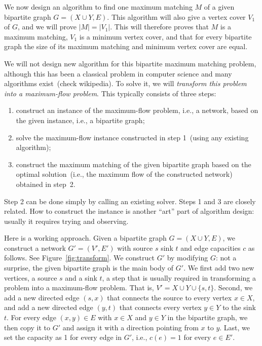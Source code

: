 We now design an algorithm to find one maximum matching $M$ of a given bipartite graph $G = (X\cup Y, E)$.
This algorithm will also give a vertex cover $V_1$ of $G$, and we will prove $|M| = |V_1|$.
This will therefore proves that $M$ is a maximum matching, $V_1$ is a minimum vertex cover, and that
for every bipartite graph the size of its maximum matching and minimum vertex cover are equal.

We will not design new algorithm for this bipartite maximum matching problem, although this has
been a classical problem in computer science and many algorithms exist~(check wikipedia).
To solve it, we will \emph{transform this problem into a maximum-flow problem}.
This typically consists of three steps:
\vspace*{-\topsep}
\begin{enumerate}
\item construct an instance of the maximum-flow problem, i.e., a network, based on the given instance, i.e., a bipartite graph;
\item solve the maximum-flow instance constructed in step 1~(using any existing algorithm);
\item construct the maximum matching of the given bipartite graph based on the optimal solution~(i.e., the maximum flow
of the constructed network) obtained in step~2.
\end{enumerate}

Step 2 can be done simply by calling an existing solver. Steps 1 and 3 are closely related.
How to construct the instance is another ``art'' part of algorithm design: usually it requires
trying and observing.

Here is a working approach. Given a bipartite graph $G = (X\cup Y, E)$, we construct
a network $G' = (V', E')$ with source $s$ sink $t$ and edge capacities $c$ as follows.
See Figure~\ref{fig:transform}.
We construct $G'$ by modifying $G$: not a surprise, the given bipartite graph is the main
body of $G'$.
We first add two new vertices, a source $s$ and a sink $t$, a step that is usually required
in transforming a problem into a maximum-flow problem.
That is, $V' = X\cup Y\cup \{s, t\}$.
Second, we add a new directed edge $(s,x)$ that connects the source to every vertex $x\in X$, 
and add a new directed edge $(y,t)$ that connects every vertex $y\in Y$ to the sink $t$. 
For every edge $(x,y)\in E$ with $x\in X$ and $y\in Y$ in the bipartite graph,
we then copy it to $G'$ and assign it with a direction pointing from $x$ to $y$.
Last, we set the capacity as 1 for every edge in $G'$, i.e., $c(e) = 1$ for every $e\in E'$.

